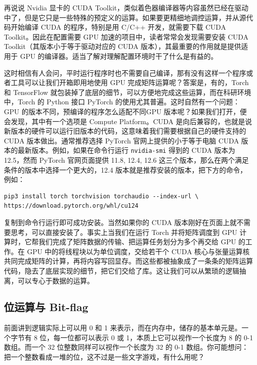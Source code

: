 再说说 Nvidia 显卡的 CUDA Toolkit，类似着色器编译器等内容虽然已经在驱动中了，但是它只是一些特殊的预定义的运算。如果要更精细地调控运算，并从源代码开始编译 CUDA 的程序，特别是用 C/C++ 开发，就需要下载 CUDA Toolkit。因此在配置需要 GPU 加速的项目中，读者常常会发现需要安装 CUDA Toolkit（其版本小于等于驱动对应的 CUDA 版本），其最重要的作用就是提供适用于 GPU 的编译器。适当了解对理解配置环境时干了什么是有益的。

这时相信有人会问，平时运行程序时也不需要自己编译，那有没有这样一个程序或者工具可以让我们开箱即用地使用 GPU 完成矩阵运算呢？答案是，有的，Torch 和 TensorFlow 就包装掉了底层的细节，可以方便地完成这些运算，而在科研环境中，Torch 的 Python 接口 PyTorch 的使用尤其普遍。这时自然有一个问题：GPU 的版本不同，预编译的程序怎么适配不同GPU 版本呢？如果我们打开，便会发现，其中有一个选项是 Compute Platform。CUDA 是向后兼容的，也就是说新版本的硬件可以运行旧版本的代码，这意味着我们需要根据自己的硬件支持的 CUDA 版本做出。通常推荐选择 PyTorch 官网上提供的小于等于电脑 CUDA 版本的最新版本。例如，如果在命令行运行 \texttt{nvidia-smi} 得到的 CUDA 版本为 12.5，然而 PyTorch 官网页面提供 11.8, 12.4, 12.6 这三个版本，那么在两个满足条件的版本中选择一个更大的，12.4 版本就是推荐安装的版本，把下方的命令，例如：
\begin{verbatim}
pip3 install torch torchvision torchaudio --index-url \
https://download.pytorch.org/whl/cu124
\end{verbatim}
复制到命令行运行即可成功安装。当然如果你的 CUDA 版本刚好在页面上就不需要思考，可以直接安装了。事实上当我们在运行 Torch 并将矩阵调度到 GPU 计算时，它帮我们完成了矩阵数据的传输、把运算任务划分为多个再交给 GPU 的工作。在 GPU 中的将线程块以为单位调度，交给若干个 CUDA 核心与张量运算核共同完成矩阵的计算，再将内容写回显存。而这些都被抽象成了一条条的矩阵运算代码，隐去了底层实现的细节，把它们交给了库。这让我们可以从繁琐的逻辑抽离，可以专心于数据的运算。

\subsection{位运算与 Bit-flag}

前面讲到逻辑实际上可以用 0 和 1 来表示，而在内存中，储存的基本单元是。一个字节有 8 位，每一位都可以表示 0 或 1，本质上它可以视作一个长度为 8 的 0-1 数组。而一个 32 位整数同样可以视作一个长度为 32 的 0-1 数组。你可能想问：把一个整数看成一堆的位，这不过是一些文字游戏，有什么用呢？

